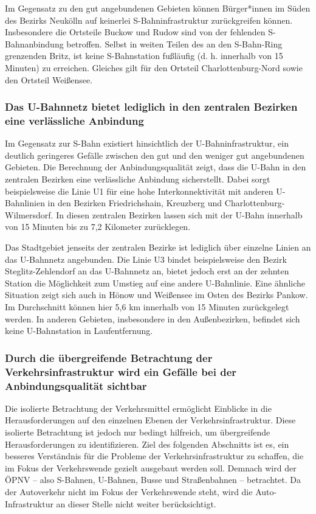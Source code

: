 
Im Gegensatz zu den gut angebundenen Gebieten können Bürger*innen im Süden des Bezirks Neukölln auf keinerlei S-Bahninfrastruktur zurückgreifen können. Insbesondere die Ortsteile Buckow und Rudow sind von der fehlenden S-Bahnanbindung betroffen. Selbst in weiten Teilen des an den S-Bahn-Ring grenzenden Britz, ist keine S-Bahnstation fußläufig (d. h. innerhalb von 15 Minuten) zu erreichen. Gleiches gilt für den Ortsteil Charlottenburg-Nord sowie den Ortsteil Weißensee.

\subsubsection{Das U-Bahnnetz bietet lediglich in den zentralen Bezirken eine verlässliche Anbindung}
Im Gegensatz zur S-Bahn existiert hinsichtlich der U-Bahninfrastruktur, ein deutlich geringeres Gefälle zwischen den gut und den weniger gut angebundenen Gebieten. Die Berechnung der Anbindungsqualität zeigt, dass die U-Bahn in den zentralen Bezirken eine verlässliche Anbindung sicherstellt. Dabei sorgt beispielsweise die Linie U1 für eine hohe Interkonnektivität mit anderen U-Bahnlinien in den Bezirken Friedrichshain, Kreuzberg und Charlottenburg-Wilmersdorf. In diesen zentralen Bezirken lassen sich mit der U-Bahn innerhalb von 15 Minuten bis zu 7,2 Kilometer zurücklegen.


Das Stadtgebiet jenseits der zentralen Bezirke ist lediglich über einzelne Linien an das U-Bahnnetz angebunden. Die Linie U3 bindet beispielsweise den Bezirk Steglitz-Zehlendorf an das U-Bahnnetz an, bietet jedoch erst an der zehnten Station die Möglichkeit zum Umstieg auf eine andere U-Bahnlinie. Eine ähnliche Situation zeigt sich auch in Hönow und Weißensee im Osten des Bezirks Pankow. Im Durchschnitt können hier 5,6 km innerhalb von 15 Minuten zurückgelegt werden. In anderen Gebieten, insbesondere in den Außenbezirken, befindet sich keine U-Bahnstation in Laufentfernung.

\subsubsection{Durch die übergreifende Betrachtung der Verkehrsinfrastruktur wird ein Gefälle bei der Anbindungsqualität sichtbar}
Die isolierte Betrachtung der Verkehrsmittel ermöglicht Einblicke in die Herausforderungen auf den einzelnen Ebenen der Verkehrsinfrastruktur. Diese isolierte Betrachtung ist jedoch nur bedingt hilfreich, um übergreifende Herausforderungen zu identifizieren. Ziel des folgenden Abschnitts ist es, ein besseres Verständnis für die Probleme der Verkehrsinfrastruktur zu schaffen, die im Fokus der Verkehrswende gezielt ausgebaut werden soll. Demnach wird der ÖPNV – also S-Bahnen, U-Bahnen, Busse und Straßenbahnen – betrachtet. Da der Autoverkehr nicht im Fokus der Verkehrswende steht, wird die Auto-Infrastruktur an dieser Stelle nicht weiter berücksichtigt.

